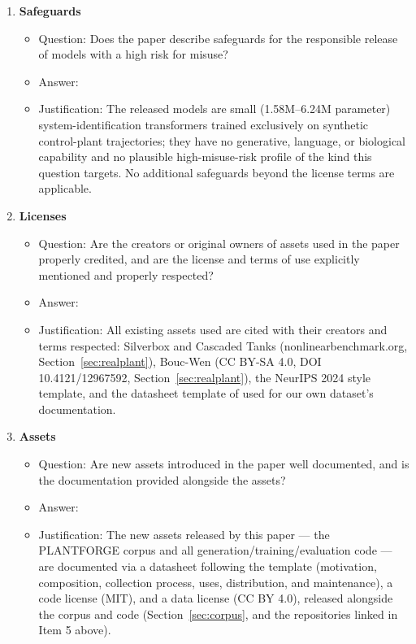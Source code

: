 \documentclass{article}
\begin{document}
\begin{enumerate}
\item {\bf Safeguards}
  \begin{itemize}
    \item Question: Does the paper describe safeguards for the responsible release of models with a high risk for misuse?
    \item Answer: \answerNA{}
    \item Justification: The released models are small (1.58M--6.24M parameter) system-identification transformers trained exclusively on synthetic control-plant trajectories; they have no generative, language, or biological capability and no plausible high-misuse-risk profile of the kind this question targets. No additional safeguards beyond the license terms are applicable.
  \end{itemize}

\item {\bf Licenses}
  \begin{itemize}
    \item Question: Are the creators or original owners of assets used in the paper properly credited, and are the license and terms of use explicitly mentioned and properly respected?
    \item Answer: \answerYes{}
    \item Justification: All existing assets used are cited with their creators and terms respected: Silverbox and Cascaded Tanks (nonlinearbenchmark.org, Section~\ref{sec:realplant}), Bouc-Wen \citep{noel2020boucwen} (CC BY-SA 4.0, DOI 10.4121/12967592, Section~\ref{sec:realplant}), the NeurIPS 2024 style template, and the datasheet template of \citet{gebru2021datasheets} used for our own dataset's documentation.
  \end{itemize}

\item {\bf Assets}
  \begin{itemize}
    \item Question: Are new assets introduced in the paper well documented, and is the documentation provided alongside the assets?
    \item Answer: \answerYes{}
    \item Justification: The new assets released by this paper --- the PLANTFORGE corpus and all generation/training/evaluation code --- are documented via a datasheet following the \citet{gebru2021datasheets} template (motivation, composition, collection process, uses, distribution, and maintenance), a code license (MIT), and a data license (CC BY 4.0), released alongside the corpus and code (Section~\ref{sec:corpus}, and the repositories linked in Item 5 above).
  \end{itemize}


\end{enumerate}
\end{document}
